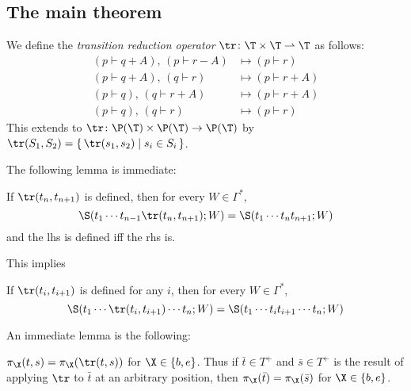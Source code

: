 \documentclass{llncs}
\begin{document}
\subsection{The main theorem}

We define the \emph{transition reduction operator} $\tr\colon\T\times\T\partial\T$ as follows:
\begin{align*}
    (p\vdash q+ A),\,(p\vdash r- A) &\mapsto (p\vdash r)\\
    (p\vdash q+ A),\,(q\vdash r) &\mapsto (p\vdash r+ A)\\
    (p\vdash q),\,(q\vdash r+ A) &\mapsto (p\vdash r+ A)\\
    (p\vdash q),\,(q\vdash r) &\mapsto (p\vdash r)
\end{align*}
This extends to $\tr\colon\P(\T)\times\P(\T)\to\P(\T)$ by $\tr(S_1,S_2)=\set{\tr(s_1,s_2)}[s_i\in S_i]$.

The following lemma is immediate:

\begin{lemma}

    If $\tr(t_n,t_{n+1})$ is defined, then for every $W\in\Gamma^*$,
    $$ \S(t_1\cdots t_{n-1}\tr(t_n,t_{n+1});W) = \S(t_1\cdots t_nt_{n+1}; W) $$
    and the lhs is defined iff the rhs is.

\end{lemma}

This implies

\begin{lemma}

    If $\tr(t_i,t_{i+1})$ is defined for any $i$, then for every $W\in\Gamma^*$,
    $$ \S(t_1\cdots \tr(t_i,t_{i+1})\cdots t_n; W) = \S(t_1\cdots t_it_{i+1}\cdots t_n;W) $$

\end{lemma}

An immediate lemma is the following:

\begin{lemma}

    $\pi_\X(t,s)=\pi_\X(\tr(t,s))$ for $\X\in\set{b,e}$.
    Thus if $\bar t\in T^+$ and $\bar s\in T^+$ is the result of applying $\tr$ to $\bar t$ at an arbitrary position, then $\pi_\X(\bar t)=\pi_\X(\bar s)$ for $\X\in\set{b,e}$.

\end{lemma}
\end{document}
